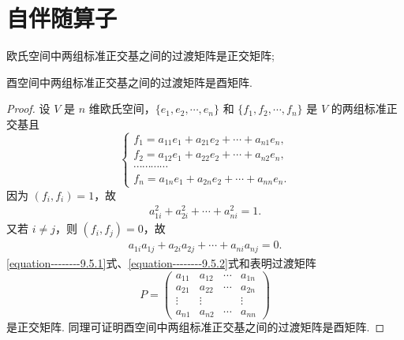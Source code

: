 \documentclass[../../main.tex]{subfiles}
\begin{document}
\section{自伴随算子}

\begin{lemma}\label{lemma:正交基之间的过渡矩阵是正交(酉)矩阵}
欧氏空间中两组标准正交基之间的过渡矩阵是正交矩阵;

酉空间中两组标准正交基之间的过渡矩阵是酉矩阵.
\end{lemma}
\begin{proof}
设 $V$ 是 $n$ 维欧氏空间，$\{e_1,e_2,\cdots,e_n\}$ 和 $\{f_1,f_2,\cdots,f_n\}$ 是 $V$ 的两组标准正交基且
\[
\begin{cases}
f_1 = a_{11}e_1 + a_{21}e_2 + \cdots + a_{n1}e_n, \\
f_2 = a_{12}e_1 + a_{22}e_2 + \cdots + a_{n2}e_n, \\
\cdots\cdots\cdots\cdots \\
f_n = a_{1n}e_1 + a_{2n}e_2 + \cdots + a_{nn}e_n.
\end{cases}
\]
因为 $(f_i,f_i) = 1$，故
\begin{align}
a_{1i}^2 + a_{2i}^2 + \cdots + a_{ni}^2 = 1.\label{equation--------9.5.1}
\end{align}
又若 $i \neq j$，则 $(f_i,f_j) = 0$，故
\begin{align}
a_{1i}a_{1j} + a_{2i}a_{2j} + \cdots + a_{ni}a_{nj} = 0.\label{equation--------9.5.2}
\end{align}
\eqref{equation--------9.5.1}式、\eqref{equation--------9.5.2}式和表明过渡矩阵
\[
P = \begin{pmatrix}
a_{11} & a_{12} & \cdots & a_{1n} \\
a_{21} & a_{22} & \cdots & a_{2n} \\
\vdots & \vdots & & \vdots \\
a_{n1} & a_{n2} & \cdots & a_{nn}
\end{pmatrix}
\]
是正交矩阵. 同理可证明酉空间中两组标准正交基之间的过渡矩阵是酉矩阵.

\end{proof}
\end{document}

